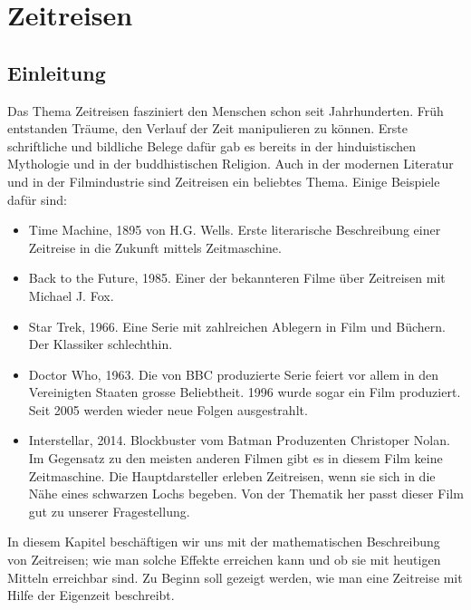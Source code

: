 \chapter{Zeitreisen\label{chapter:zeitreisen}}
\begin{refsection}
\section{Einleitung}
	Das Thema Zeitreisen fasziniert den Menschen schon seit Jahrhunderten. Früh entstanden Träume, den Verlauf der Zeit manipulieren zu können. Erste schriftliche und bildliche Belege dafür gab es bereits in der hinduistischen Mythologie und in der buddhistischen Religion. Auch in der modernen Literatur und in der Filmindustrie sind Zeitreisen ein beliebtes Thema. Einige Beispiele dafür sind: 
%
\begin{itemize}
    \item Time Machine, 1895 von H.G. Wells. Erste literarische Beschreibung einer Zeitreise in die Zukunft mittels Zeitmaschine.
%
    \item Back to the Future, 1985. Einer der bekannteren Filme über Zeitreisen mit Michael J. Fox.
%
    \item Star Trek, 1966. Eine Serie mit zahlreichen Ablegern in Film und Büchern. Der Klassiker schlechthin. 
%
    \item Doctor Who, 1963. Die von BBC produzierte Serie feiert vor allem in den Vereinigten Staaten grosse Beliebtheit. 1996 wurde sogar ein Film produziert. Seit 2005 werden wieder neue Folgen ausgestrahlt.
%
    \item Interstellar, 2014. Blockbuster vom Batman Produzenten Christoper Nolan. Im Gegensatz zu den meisten anderen Filmen gibt es in diesem Film keine Zeitmaschine. Die Hauptdarsteller erleben Zeitreisen, wenn sie sich in die Nähe eines schwarzen Lochs begeben. Von der Thematik her passt dieser Film gut zu unserer Fragestellung.
%
\end{itemize}

In diesem Kapitel beschäftigen wir uns mit der mathematischen Beschreibung von Zeitreisen; wie man solche Effekte erreichen kann und ob sie mit heutigen Mitteln erreichbar sind. Zu Beginn soll gezeigt werden, wie man eine Zeitreise mit Hilfe der Eigenzeit beschreibt.
%


\end{refsection}
